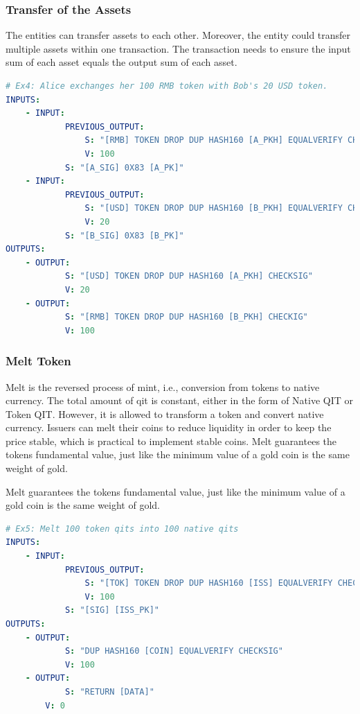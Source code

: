 \documentclass[a4paper,11pt]{article}
\begin{document}
\subsubsection{Transfer of the Assets}

The entities can transfer assets to each other. Moreover, the entity could transfer multiple assets within one transaction. The transaction needs to ensure the input sum of each asset equals the output sum of each asset.

\lstset{basicstyle=\tiny,style=myListStyle}
\begin{lstlisting}[language=yaml, numbers=none,basicstyle=\footnotesize]
# Ex4: Alice exchanges her 100 RMB token with Bob's 20 USD token.
INPUTS:
	- INPUT:
			PREVIOUS_OUTPUT:
				S: "[RMB] TOKEN DROP DUP HASH160 [A_PKH] EQUALVERIFY CHECKSIG"
				V: 100
			S: "[A_SIG] 0X83 [A_PK]"
	- INPUT:
			PREVIOUS_OUTPUT:
				S: "[USD] TOKEN DROP DUP HASH160 [B_PKH] EQUALVERIFY CHECKSIG"
				V: 20
			S: "[B_SIG] 0X83 [B_PK]"
OUTPUTS:
	- OUTPUT:
			S: "[USD] TOKEN DROP DUP HASH160 [A_PKH] CHECKSIG"
			V: 20
	- OUTPUT:
			S: "[RMB] TOKEN DROP DUP HASH160 [B_PKH] CHECKIG"
			V: 100
\end{lstlisting}


\subsubsection{Melt Token}

Melt is the reversed process of mint, i.e., conversion from tokens to native currency. The total amount of qit is constant, either in the form of Native QIT or Token QIT. However, it is allowed to transform a token and convert native currency. Issuers can melt their coins to reduce liquidity in order to keep the price stable, which is practical to implement stable coins. Melt guarantees the tokens fundamental value, just like the minimum value of a gold coin is the same weight of gold.   


Melt guarantees the tokens fundamental value, just like the minimum value of a gold coin is the same weight of gold.

\lstset{basicstyle=\tiny,style=myListStyle}
\begin{lstlisting}[language=yaml, numbers=none,basicstyle=\footnotesize]
# Ex5: Melt 100 token qits into 100 native qits
INPUTS:
	- INPUT:
			PREVIOUS_OUTPUT:
				S: "[TOK] TOKEN DROP DUP HASH160 [ISS] EQUALVERIFY CHECKSIG"
				V: 100
			S: "[SIG] [ISS_PK]"
OUTPUTS:
	- OUTPUT:
			S: "DUP HASH160 [COIN] EQUALVERIFY CHECKSIG"
			V: 100
	- OUTPUT:
			S: "RETURN [DATA]"
		V: 0
\end{lstlisting}
\end{document}
